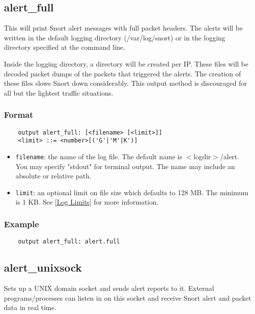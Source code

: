 \documentclass[english]{report}
\begin{document}
\subsection{alert\_full}

This will print Snort alert messages with full packet headers. The alerts will
be written in the default logging directory (/var/log/snort) or in the logging
directory specified at the command line.

Inside the logging directory, a directory will be created per IP.  These files
will be decoded packet dumps of the packets that triggered the alerts. The
creation of these files slows Snort down considerably.  This output method is
discouraged for all but the lightest traffic situations.

\subsubsection{Format}

\begin{verbatim}
    output alert_full: [<filename> [<limit>]]
    <limit> ::= <number>[('G'|'M'|K')]
\end{verbatim}

\begin{itemize}
\item \texttt{filename}: the name of the log file.  The default name is
$<$logdir$>$/alert.  You may specify "stdout" for terminal output.  The name may
include an absolute or relative path.

\item \texttt{limit}: an optional limit on file size which defaults to 128 MB.  
The minimum is 1 KB.  See \ref{Log Limits} for more information.
\end{itemize}

\subsubsection{Example}

\begin{verbatim}
    output alert_full: alert.full
\end{verbatim}

\subsection{alert\_unixsock}

Sets up a UNIX domain socket and sends alert reports to it. External
programs/processes can listen in on this socket and receive Snort alert and
packet data in real time.
\end{document}
